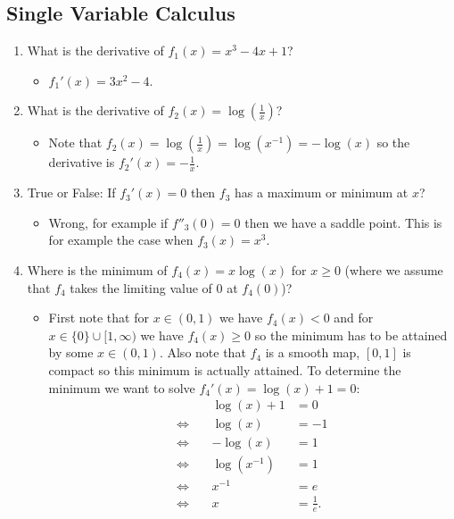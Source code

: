 \documentclass{article}
\begin{document}
\subsection{Single Variable Calculus}
\begin{enumerate}
	\item What is the derivative of $f_1(x) = x^3 - 4x + 1$?
		\begin{itemize}
			\item $f_1'(x) = 3x^2 - 4$.
		\end{itemize}
	\item What is the derivative of $f_2(x) = \log\left( \frac{1}{x} \right)$?
		\begin{itemize}
			\item Note that $f_2(x) = \log\left(\frac{1}{x}\right) = \log(x^{-1}) = - \log(x)$ so the derivative is $f_2'(x) = - \frac{1}{x}$.
		\end{itemize}
	\item True or False: If $f_3'(x) = 0$ then $f_3$ has a maximum or minimum at $x$?
		\begin{itemize}
			\item Wrong, for example if $f''_3(0) = 0$ then we have a saddle point. This is for example the case when $f_3(x) = x^3$.
		\end{itemize}
	\item Where is the minimum of $f_4(x) = x \log(x)$ for $x \geq 0$ (where we assume that $f_4$ takes the limiting value of $0$ at $f_4(0)$)?
		\begin{itemize}
			\item First note that for $x \in (0, 1)$ we have $f_4(x) < 0$ and for $x \in \{0\} \cup [1, \infty)$ we have $f_4(x) \geq 0$ so the minimum has to be attained by some $x \in (0, 1)$. Also note that $f_4$ is a smooth map, $[0, 1]$ is compact so this minimum is actually attained. To determine the minimum we want to solve $f_4'(x) = \log(x) + 1 = 0$:
			$$
			\begin{aligned}
			&& \log(x) + 1 &= 0 \\
			\iff\ && \log(x) &= -1 \\
			\iff\ && -\log(x) &= 1 \\
			\iff\ && \log(x^{-1}) &= 1 \\
			\iff\ &&  x^{-1} &= e \\
			\iff\ && x &= \frac{1}{e}.
			\end{aligned}
			$$
		\end{itemize}
\end{enumerate}
\end{document}

